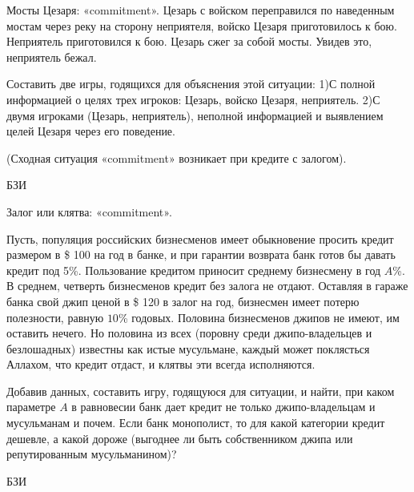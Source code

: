\begin{problem}

{\rm Мосты Цезаря: «commitment».} Цезарь с войском
переправился по наведенным мостам через реку на сторону
неприятеля, войско Цезаря приготовилось к бою. Неприятель
приготовился к бою. Цезарь сжег за собой мосты. Увидев это,
неприятель бежал.

Составить две игры, годящихся для объяснения этой ситуации:
1)С полной информацией о целях трех игроков: Цезарь, войско
Цезаря, неприятель. 2)С двумя игроками (Цезарь,
неприятель), неполной информацией и выявлением целей Цезаря
через его поведение.

(Сходная ситуация «commitment» возникает при кредите с
залогом).



\begin{source}
БЗИ
\end{source}


\begin{sol}

\end{sol}
\end{problem}




\begin{problem}

{\rm Залог или клятва: «commitment».}

Пусть, популяция российских бизнесменов имеет обыкновение
просить кредит размером в \$ 100 на год в банке, и при
гарантии возврата банк готов бы давать кредит под 5\%.
Пользование кредитом приносит среднему бизнесмену в год
$A$\%. В среднем, четверть бизнесменов кредит без залога не
отдают. Оставляя в гараже банка свой джип ценой в \$ 120  в
залог на год, бизнесмен имеет потерю полезности, равную
$10$\% годовых. Половина бизнесменов джипов не имеют, им
оставить нечего. Но половина из всех (поровну среди
джипо-владельцев и безлошадных) известны как истые
мусульмане, каждый может поклясться Аллахом, что кредит
отдаст, и клятвы эти всегда исполняются.

Добавив данных, составить игру, годящуюся для ситуации, и
найти, при каком параметре $A$ в равновесии банк дает
кредит не только джипо-владельцам и мусульманам и почем.
Если банк монополист, то для какой категории кредит
дешевле, а какой дороже (выгоднее ли быть собственником
джипа или репутированным мусульманином)?



\begin{source}
БЗИ
\end{source}


\begin{sol}

\end{sol}
\end{problem}



